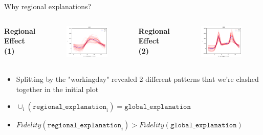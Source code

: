 \documentclass[10pt,compress,t,notes=noshow, xcolor=table]{beamer}
\begin{document}
\begin{frame}{Why regional explanations?}
\begin{columns}
      \hspace{2.5cm} %
      \centering
      \textbf{Regional Effect (1)}
        \begin{figure}
          \centering
          \includegraphics[width=.9\linewidth]{figure/01_bike_sharing_dataset_28_0.png}
      \end{figure}

     \centering
      \textbf{Regional Effect (2)}
        \begin{figure}
          \centering
          \includegraphics[width=.9\linewidth]{figure/01_bike_sharing_dataset_28_1.png}
      \end{figure}     
  \end{columns}
      \begin{itemize}
      \item Splitting by the "workingday" revealed 2 different patterns that we're clashed together in the initial plot
      \item $\cup_i (\texttt{regional\_explanation}_i) = \texttt{global\_explanation} $
      \item $Fidelity (\texttt{regional\_explanation}_i ) > Fidelity(\texttt{global\_explanation} ) $
      \end{itemize}
      
\end{frame}
\end{document}
